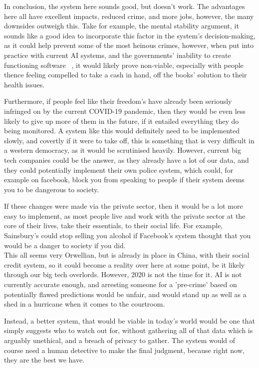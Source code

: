 
  In conclusion, the system here sounds good, but doesn't work.
  The advantages here all have excellent impacts, reduced crime, and more jobs, however, the many downsides
  outweigh this.
  Take for example, the mental stability argument, it sounds like a good idea to incorporate this factor in the
  system's decision-making, as it could help prevent some of the most heinous crimes, however, when put into practice
  with current AI systems, and the governments' inability to create functioning software ~\cite{nhs-app-issue}, it
  would likely prove non-viable, especially with people thence feeling compelled to take a cash in hand, off the
  books' solution to their health issues.

  Furthermore, if people feel like their freedom's have already been seriously infringed on by the current COVID-19
  pandemic, then they would be even less likely to give up more of them in the future, if it entailed everything they
  do being monitored.
  A system like this would definitely need to be implemented slowly, and covertly if it were to take off, this is
  something that is very difficult in a western democracy, as it would be scrutinised heavily.
  However, current big tech companies could be the answer, as they already have a lot of our data, and they could
  potentially implement their own police system, which could, for example on facebook, block you from speaking to
  people if their system deems you to be dangerous to society.

  If these changes were made via the private sector, then it would be a lot more easy to implement, as most
  people live and work with the private sector at the core of their lives, take their essentials, to their social
  life.
  For example, Sainsbury's could stop selling you alcohol if Facebook's system thought that you would be a danger to
  society if you did.
  \\

  This all seems very Orwellian, but is already in place in China, with their social credit system, so it could
  become a reality over here at some point, be it likely through our big tech overlords.
  However, 2020 is not the time for it.
  AI is not currently accurate enough, and arresting someone for a 'pre-crime' based on potentially flawed
  predictions would be unfair, and would stand up as well as a shed in a hurricane when it comes to the courtroom.

  Instead, a better system, that would be viable in today's world would be one that simply suggests who to watch
  out for, without gathering all of that data which is arguably unethical, and a breach of privacy to gather.
  The system would of course need a human detective to make the final judgment, because right now, they are the
  best we have.

